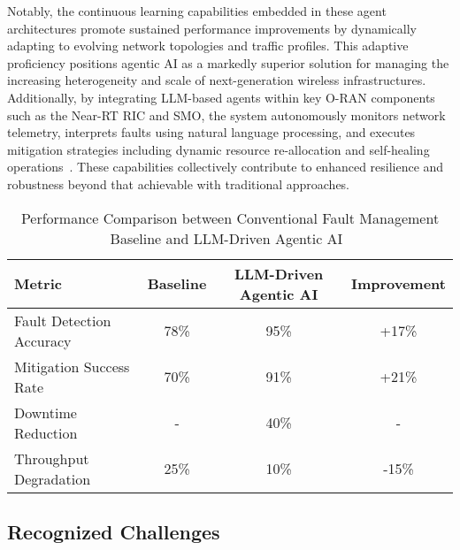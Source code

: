 \documentclass[sigconf]{acmart}
\begin{document}
Notably, the continuous learning capabilities embedded in these agent architectures promote sustained performance improvements by dynamically adapting to evolving network topologies and traffic profiles. This adaptive proficiency positions agentic AI as a markedly superior solution for managing the increasing heterogeneity and scale of next-generation wireless infrastructures. Additionally, by integrating LLM-based agents within key O-RAN components such as the Near-RT RIC and SMO, the system autonomously monitors network telemetry, interprets faults using natural language processing, and executes mitigation strategies including dynamic resource re-allocation and self-healing operations~\cite{ref55}. These capabilities collectively contribute to enhanced resilience and robustness beyond that achievable with traditional approaches.

\begin{table*}[htbp]
\centering
\caption{Performance Comparison between Conventional Fault Management Baseline and LLM-Driven Agentic AI~\cite{ref55}}
\label{tab:performance_comparison}
\begin{adjustbox}{max width=\textwidth}
\begin{tabular}{@{}lccc@{}}
\toprule
Metric & Baseline & LLM-Driven Agentic AI & Improvement \\ \midrule
Fault Detection Accuracy & 78\% & 95\% & +17\% \\
Mitigation Success Rate & 70\% & 91\% & +21\% \\
Downtime Reduction & - & 40\% & - \\
Throughput Degradation & 25\% & 10\% & -15\% \\ \bottomrule
\end{tabular}
\end{adjustbox}
\end{table*}

\subsection{Recognized Challenges}
\end{document}
